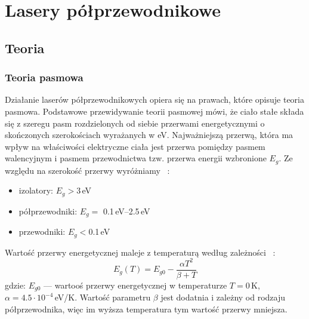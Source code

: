 \chapter{Lasery półprzewodnikowe}
\section{Teoria}
\subsection{Teoria pasmowa}
Działanie laserów półprzewodnikowych opiera się na prawach, które opisuje teoria pasmowa.
Podstawowe przewidywanie teorii pasmowej mówi, że ciało stałe składa się z szeregu pasm rozdzielonych od siebie
przerwami energetycznymi o skończonych szerokościach wyrażanych w eV. Najważniejszą przerwą, która ma wpływ na właściwości elektryczne ciała jest
przerwa pomiędzy pasmem walencyjnym i pasmem przewodnictwa tzw. przerwa energii wzbronione $E_g$. Ze względu na szerokość przerwy
wyróżniamy ~\cite{laser_book}:
\begin{itemize}
\item izolatory: $E_g > 3$\,eV
\item półprzewodniki: $E_g =$ 0.1\,eV--2.5\,eV
\item przewodniki: $E_g<$0.1\,eV
\end{itemize}
Wartość przerwy energetycznej maleje z temperaturą według zależności ~\cite{laser_book}:
\begin{equation}
E_g(T) = E_{g0} - \frac{\alpha T^2}{\beta + T}
\end{equation}
gdzie: $E_{g0}$ --- wartooś przerwy energetycznej w temperaturze $T=0$\,K, \\ $\alpha = 4.5 \cdot 10^{-4}$\,eV/K.
Wartość parametru $\beta$ jest dodatnia i zależny od rodzaju półprzewodnika, więc im wyższa temperatura tym wartość przerwy mniejsza.
